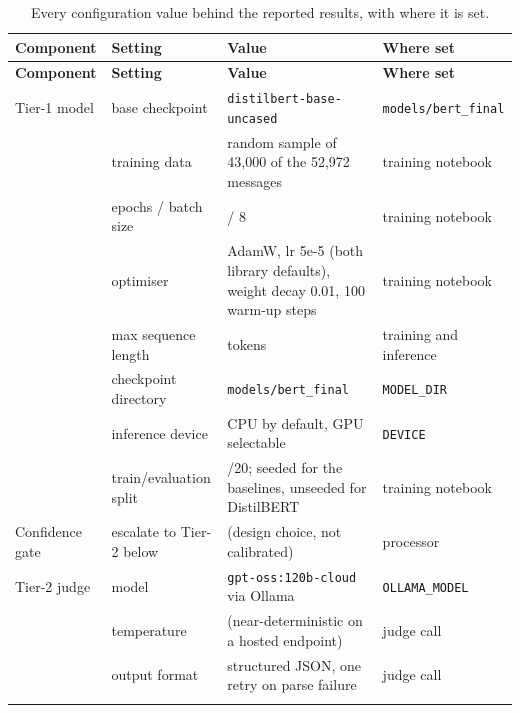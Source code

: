 \begin{longtable}{@{}
  >{\raggedright\arraybackslash}p{}
  >{\raggedright\arraybackslash}p{}
  >{\raggedright\arraybackslash}p{}
  >{\raggedright\arraybackslash}p{}@{}}
\caption{Every configuration value behind the reported results, with where it is set.}\label{tab:params}\tabularnewline
\toprule
\textbf{Component} & \textbf{Setting} & \textbf{Value} & \textbf{Where set} \\
\midrule
\endfirsthead
\toprule
\textbf{Component} & \textbf{Setting} & \textbf{Value} & \textbf{Where set} \\
\midrule
\endhead
\bottomrule
\endlastfoot

Tier-1 model & base checkpoint & \texttt{distilbert-\allowbreak base-\allowbreak uncased} & \texttt{models/\allowbreak bert\_final} \\
 & training data & random sample of 43,000 of the 52,972 messages & training notebook \\
 & epochs / batch size & 2 / 8 & training notebook \\
 & optimiser & AdamW, lr 5e-5 (both library defaults), weight decay 0.01, 100 warm-up steps & training notebook \\
 & max sequence length & 128 tokens & training and inference \\
 & checkpoint directory & \texttt{models/bert\_final} & \texttt{MODEL\_DIR} \\
 & inference device & CPU by default, GPU selectable & \texttt{DEVICE} \\
 & train/evaluation split & 80/20; seeded for the baselines, unseeded for DistilBERT & training notebook \\
\addlinespace[1em]

Confidence gate & escalate to Tier-2 below & 0.80 (design choice, not calibrated) & processor \\
\addlinespace[1em]

Tier-2 judge & model & \texttt{gpt-oss:120b-\allowbreak cloud} via Ollama & \texttt{OLLAMA\_MODEL} \\
 & temperature & 0 (near-deterministic on a hosted endpoint) & judge call \\
 & output format & structured JSON, one retry on parse failure & judge call \\
\addlinespace[1em]


\end{longtable}
